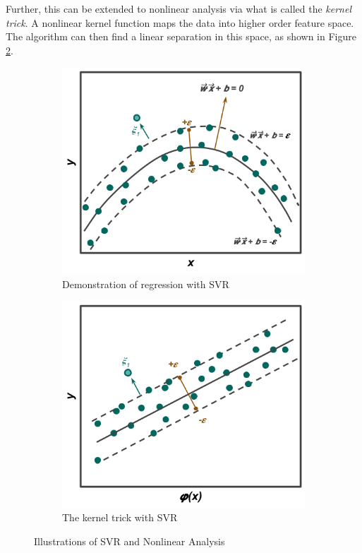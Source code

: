 Further, this can be extended to nonlinear analysis via what is called the
\textit{kernel trick}.  A nonlinear kernel function maps the data
into higher order feature space. The algorithm can then find a linear
separation in this space, as shown in Figure \ref{fig:svr-b}.

\begin{figure}[!hp]
  \centering
  \begin{subfigure}[h]{0.8\linewidth}
    \includegraphics[width=\linewidth]{./chapters/litrev/svr-a.png}
    \caption{Demonstration of regression with \gls{SVR}}
    \label{fig:svr-a}
  \end{subfigure}
  \begin{subfigure}[h]{0.8\linewidth}
    \includegraphics[width=\linewidth]{./chapters/litrev/svr-b.png}
    \caption{The kernel trick with \gls{SVR}}
    \label{fig:svr-b}
  \end{subfigure}
  \caption{Illustrations of SVR and Nonlinear Analysis}
  \label{fig:svr}
\end{figure}

